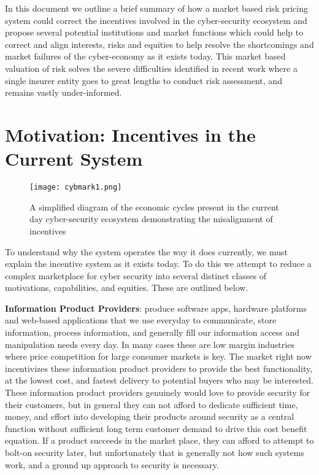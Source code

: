 \documentclass[conference]{IEEEtran}
\begin{document}
In this document we outline a brief summary of how a market based risk pricing system could correct the incentives involved in the cyber-security ecosystem and propose several potential institutions and market functions which could help to correct and align interests, risks and equities to help resolve the shortcomings and market failures of the cyber-economy as it exists today.  This market based valuation of risk solves the severe difficulties identified in recent work where a single insurer entity goes to great lengths to conduct risk assessment, and remains vastly under-informed. \cite{biener2015insurability} \cite{mukhopadhyay2013cyber}

\section{Motivation: Incentives in the Current System}

\begin{figure*}[ht!]
  \centering
      \texttt{[image: cybmark1.png]}
        \caption{A simplified diagram of the economic cycles present in the current day cyber-security ecosystem demonstrating the misalignment of incentives }
    \label{fig:basis}
\end{figure*}
 
To understand why the system operates the way it does currently, we must explain the incentive system as it exists today.  To do this we attempt to reduce a complex marketplace for cyber security into several distinct classes of motivations, capabilities, and equities.  These are outlined below.

\textbf{Information Product Providers}: produce software apps, hardware platforms and web-based applications that we use everyday to communicate, store information, process information, and generally fill our information access and manipulation needs every day.   In many cases these are low margin industries where price competition for large consumer markets is key.  The market right now incentivizes these information product providers to provide the best functionality, at the lowest cost, and fastest delivery to potential buyers who may be interested.   These information product providers genuinely would love to provide security for their customers, but in general they can not afford to dedicate sufficient time, money, and effort into developing their products around security as a central function without sufficient long term customer demand to drive this cost benefit equation.   If a product succeeds in the market place, they can afford to attempt to bolt-on security later, but unfortunately that is generally not how such systems work, and a ground up approach to security is necessary.
\end{document}
